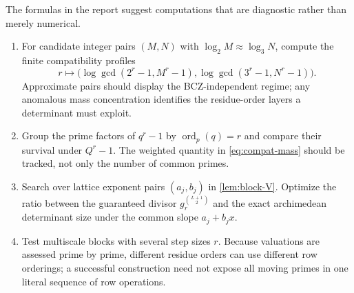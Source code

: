 \documentclass[11pt]{article}
\theoremstyle{definition}
\theoremstyle{remark}
\newcommand{\ord}{\operatorname{ord}}
\begin{document}
The formulas in the report suggest computations that are diagnostic rather
than merely numerical.
\begin{enumerate}
 \item For candidate integer pairs $(M,N)$ with
       $\log_2 M\approx\log_3 N$, compute the finite compatibility
       profiles
       \[
       r\longmapsto
       \bigl(\log\gcd(2^r-1,M^r-1),
             \log\gcd(3^r-1,N^r-1)\bigr).
       \]
       Approximate pairs should display the BCZ-independent regime; any
       anomalous mass concentration identifies the residue-order layers a
       determinant must exploit.
 \item Group the prime factors of $q^r-1$ by $\ord_p(q)=r$ and compare their
       survival under $Q^r-1$.  The weighted quantity in
       \eqref{eq:compat-mass} should be tracked, not only the number of common
       primes.
 \item Search over lattice exponent pairs $(a_j,b_j)$ in
       \cref{lem:block-V}.  Optimize the ratio between the guaranteed divisor
       $g_r^{\binom{L+1}{2}}$ and the exact archimedean determinant size under
       the common slope $a_j+b_jx$.
 \item Test multiscale blocks with several step sizes $r$.  Because valuations
       are assessed prime by prime, different residue orders can use different
       row orderings; a successful construction need not expose all moving
       primes in one literal sequence of row operations.
\end{enumerate}
\end{document}
